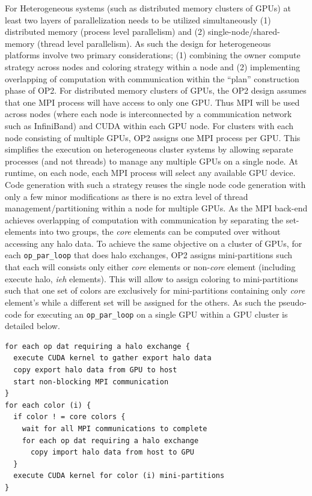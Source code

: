 \documentclass[11pt]{article}
\begin{document}
For Heterogeneous systems (such as distributed memory clusters of GPUs) at least two layers of parallelization needs to
be utilized simultaneously (1) distributed memory (process level parallelism) and (2) single-node/shared-memory (thread
level parallelism). As such the design for heterogeneous platforms involve two primary considerations; (1) combining the
owner compute strategy across nodes and coloring strategy within a node and (2) implementing overlapping of computation
with communication within the ``plan'' construction phase of OP2. For distributed memory clusters of GPUs, the OP2
design assumes that one MPI process will have access to only one GPU. Thus MPI will be used across nodes (where each
node is interconnected by a communication network such as InfiniBand) and CUDA within each GPU node. For clusters with
each node consisting of multiple GPUs, OP2 assigns one MPI process per GPU. This simplifies the execution on
heterogeneous cluster systems by allowing separate processes (and not threads) to manage any multiple GPUs on a single
node. At runtime, on each node, each MPI process will select any available GPU device. Code generation with such a
strategy reuses the single node code generation with only a few minor modifications as there is no extra level of thread
management/partitioning within a node for multiple GPUs. As the MPI back-end achieves overlapping of computation with
communication by separating the set-elements into two groups, the \textit{core} elements can be computed over without
accessing any halo data. To achieve the same objective on a cluster of GPUs, for each \texttt{op\_par\_loop} that does
halo exchanges, OP2 assigns mini-partitions such that each will consists only either \textit{core} elements or
non-\textit{core} element (including execute halo, \textit{ieh} elements). This will allow to assign coloring to
mini-partitions such that one set of colors are exclusively for mini-partitions containing only \textit{core} element's
while a different set will be assigned for the others. As such the pseudo-code for executing an \texttt{op\_par\_loop}
on a single GPU within a GPU cluster is detailed below.
\begin{verbatim}
for each op dat requiring a halo exchange {
  execute CUDA kernel to gather export halo data
  copy export halo data from GPU to host
  start non-blocking MPI communication
}
for each color (i) {
  if color ! = core colors {
    wait for all MPI communications to complete
    for each op dat requiring a halo exchange
      copy import halo data from host to GPU
  }
  execute CUDA kernel for color (i) mini-partitions
}
\end{verbatim}
\end{document}
